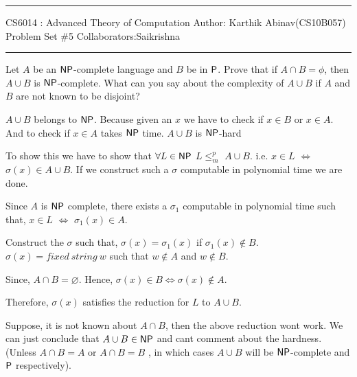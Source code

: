 \documentclass[12pt]{exam}
\begin{document}
\hrule
\vspace{3mm}
\noindent 
{\sf CS6014 : Advanced Theory of Computation  \hfill Author: Karthik Abinav(CS10B057)}
\vspace{3mm}\\
\noindent 
{\sf Problem Set \#5 \hfill Collaborators:Saikrishna}
\vspace{3mm}
\hrule

\begin{questions}

\question
Let $A$ be an $\NP$-complete language and $B$ be in $\P$. Prove that if $A \cap B = \phi$, then  $A \cup B$ is $\NP$-complete. What can you say about the complexity of $A \cup B$ if $A$ and $B$ are not known to be disjoint?
\begin{solution}
 
 $A \cup B$ belongs to $\NP$. Because given an $x$ we have to check if $x \in B$ or $x \in A$. And to check if $x \in A$ takes $\NP$ time. \newline
 $A \cup B$ is $\NP$-hard \newline
 
 To show this we have to show that $\forall L \in \NP$ $L \leq_{m}^{p}$  $A \cup B$.
 i.e.
 $x \in L$ $\Leftrightarrow$ $\sigma(x) \in A \cup B$.
 If we construct such a $\sigma$ computable in polynomial time we are done. \newline
 
 Since $A$ is $\NP$ complete, there exists a $\sigma_{1}$ computable in polynomial time such that,\newline
 $x \in L$ $\Leftrightarrow$ $\sigma_{1}(x) \in A$. \newline
 
 Construct the $\sigma$ such that, $\sigma(x) = \sigma_{1}(x)$ if $\sigma_{1}(x) \notin B$.\newline
 $\sigma(x) = fixed~string~w$ such that $w \notin A$ and $w \notin B$.\newline
 
 Since, $A \cap B = \varnothing$. Hence, $\sigma(x) \in B \Leftrightarrow \sigma(x) \notin A$.
 
 Therefore, $\sigma(x)$ satisfies the reduction for $L$ to $A \cup B$.\newline

 Suppose, it is not known about $A \cap B$, then the above reduction wont work. We can just conclude that $A \cup B \in \NP$ and cant
 comment about the hardness. (Unless $A \cap B = A$ or $A \cap B = B$ , in which cases $A \cup B$ will be  $\NP$-complete and $\P$ respectively).
 

\end{solution}
\end{questions}
\end{document}
